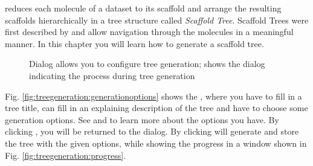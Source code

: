 \sh reduces each molecule of a dataset to its scaffold and arrange the resulting scaffolds hierarchically in a tree structure called \textit{Scaffold Tree}.
Scaffold Trees were first described by \cite{schuffenhauer_et_al2007} and allow navigation through the molecules in a meaningful manner.
In this chapter you will learn how to generate a scaffold tree.


\begin{figure}[!htb]
   \centering
   \quad
   \caption[Scaffold Tree Generation Dialog / Tree Generation Process Window]{Dialog \protect{} allows you to configure tree generation; \protect{} shows the dialog indicating the process during tree generation}
   \label{fig:treegeneration}
\end{figure}


Fig. \ref{fig:treegeneration:generationoptions} shows the , where you have to fill in a tree title,
can fill in an explaining description of the tree and have to choose some generation options.
See  and  to learn more about the options you have.
By clicking , you will be returned to the  dialog.
By clicking  \sh will generate and store the tree with the given options,
while showing the progress in a window shown in Fig. \ref{fig:treegeneration:progress}.
	
